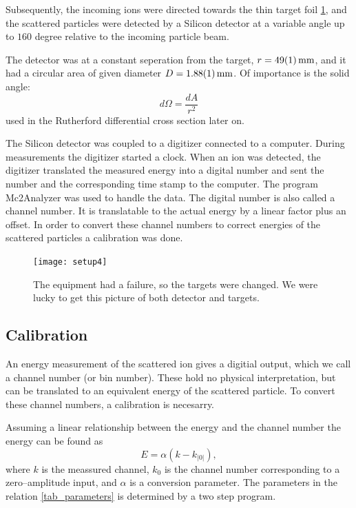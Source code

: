 Subsequently, the incoming ions were directed towards the thin target foil
\cref{fig_setup4}, and the scattered particles were detected by a Silicon
detector at a variable angle up to $160$ degree relative to the
incoming particle beam.

The detector was at a constant seperation from the target, $r =
\SI{49\pm1}{\milli\meter}$, and it had a circular area of given diameter
$D=\SI{1.88 \pm 0.01}{\milli\meter}$. Of importance is the solid angle:
\begin{equation}
d\Omega = \frac{dA}{r^2}
\end{equation}
used in the Rutherford differential cross section later on.

The Silicon detector was coupled to a digitizer connected to a computer. During
measurements the digitizer started a clock. When an ion was detected, the
digitizer translated the measured energy into a digital number and sent the
number and the corresponding time stamp to the computer.  The program
Mc2Analyzer was used to handle the data. The digital number is also called a
channel number. It is translatable to the actual energy by a linear factor plus
an offset. In order to convert these channel numbers to correct energies of the
scattered particles a calibration was done.
%
\begin{figure}[t]
    \centering
    \texttt{[image: setup4]}
    \caption{The equipment had a failure, so the targets were changed. We were
    lucky to get this picture of both detector and targets.}
    \label{fig_setup4}
\end{figure}
%
\subsection{Calibration}
An energy measurement of the scattered ion gives a digitial output, which we call
a channel number (or bin number). These hold no physical interpretation, but
can be translated to an equivalent energy of the scattered particle. To
convert these channel numbers, a calibration is necesarry. 

Assuming a linear relationship between the energy and the channel number the
energy can be found as
\begin{equation}
    E = \alpha(k - k_|0|), \label{eq_calibration}
\end{equation}
where $k$ is the meassured channel, $k_0$ is the channel number corresponding to
a zero--amplitude input, and $\alpha$ is a conversion parameter.
The parameters in the relation \cref{tab_parameters} is determined by a two
step program.

